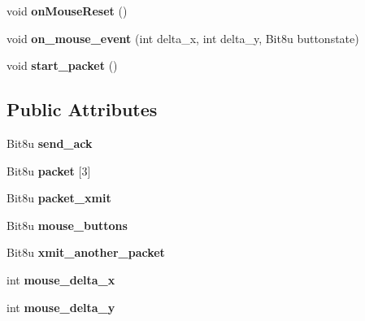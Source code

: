 \begin{DoxyCompactItemize}
\item 
\hypertarget{classCSerialMouse_ac33697aec9a1c937ea148d1a8d17ef66}{void {\bfseries on\-Mouse\-Reset} ()}\label{classCSerialMouse_ac33697aec9a1c937ea148d1a8d17ef66}

\item 
\hypertarget{classCSerialMouse_a602b3efff01fdee515d23b9025a146d6}{void {\bfseries on\-\_\-mouse\-\_\-event} (int delta\-\_\-x, int delta\-\_\-y, Bit8u buttonstate)}\label{classCSerialMouse_a602b3efff01fdee515d23b9025a146d6}

\item 
\hypertarget{classCSerialMouse_ae2878fe6cab53b6f2896a12de75364d6}{void {\bfseries start\-\_\-packet} ()}\label{classCSerialMouse_ae2878fe6cab53b6f2896a12de75364d6}

\end{DoxyCompactItemize}
\subsection*{Public Attributes}
\begin{DoxyCompactItemize}
\item 
\hypertarget{classCSerialMouse_ab0c90ed4c6767060ada8cfbe0246d1b8}{Bit8u {\bfseries send\-\_\-ack}}\label{classCSerialMouse_ab0c90ed4c6767060ada8cfbe0246d1b8}

\item 
\hypertarget{classCSerialMouse_a90daf42329ed126107dace05a34bf737}{Bit8u {\bfseries packet} \mbox{[}3\mbox{]}}\label{classCSerialMouse_a90daf42329ed126107dace05a34bf737}

\item 
\hypertarget{classCSerialMouse_aadac1a4bed0949f61fe8b4542fd51794}{Bit8u {\bfseries packet\-\_\-xmit}}\label{classCSerialMouse_aadac1a4bed0949f61fe8b4542fd51794}

\item 
\hypertarget{classCSerialMouse_ae7c021aa53dc026703a7c2d5b0d43721}{Bit8u {\bfseries mouse\-\_\-buttons}}\label{classCSerialMouse_ae7c021aa53dc026703a7c2d5b0d43721}

\item 
\hypertarget{classCSerialMouse_ad30cc88a72d2735c5b3cf9a2f36af733}{Bit8u {\bfseries xmit\-\_\-another\-\_\-packet}}\label{classCSerialMouse_ad30cc88a72d2735c5b3cf9a2f36af733}

\item 
\hypertarget{classCSerialMouse_a14e865d07f45a13a6e7a7875f1c3c72a}{int {\bfseries mouse\-\_\-delta\-\_\-x}}\label{classCSerialMouse_a14e865d07f45a13a6e7a7875f1c3c72a}

\item 
\hypertarget{classCSerialMouse_a2aa1ffe757b4ce1c1915fec3146427ef}{int {\bfseries mouse\-\_\-delta\-\_\-y}}\label{classCSerialMouse_a2aa1ffe757b4ce1c1915fec3146427ef}

\end{DoxyCompactItemize}


